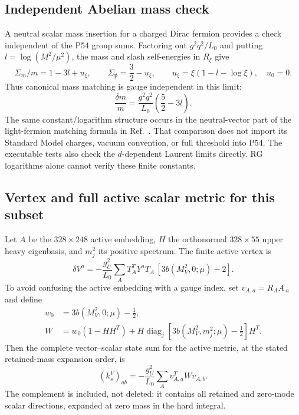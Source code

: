 \documentclass[11pt]{article}
\newcommand{\diag}{\operatorname{diag}}
\begin{document}
\subsection{Independent Abelian mass check}
A neutral scalar mass insertion for a charged Dirac fermion provides a
check independent of the P54 group sums. Factoring out $g^2q^2/L_0$ and
putting $l=\log(M^2/\mu^2)$, the mass and slash self-energies in $R_\xi$
give
\begin{equation}
 \Sigma_m/m=1-3l+u_\xi,\qquad
 \Sigma_{\not p}=\frac32-u_\xi,\qquad
 u_\xi=\xi(1-l-\log\xi),\quad u_0=0.
\end{equation}
Thus canonical mass matching is gauge independent in this limit:
\begin{equation}
 \frac{\delta m}{m}=\frac{g^2q^2}{L_0}\left(\frac52-3l\right).
\end{equation}
The same constant/logarithm structure occurs in the neutral-vector
part of the light-fermion matching formula in Ref.~\cite{martin}.
That comparison does not import its Standard Model charges, vacuum
convention, or full threshold into P54. The executable tests also check
the $d$-dependent Laurent limits directly. RG logarithms alone cannot
verify these finite constants.

\subsection{Vertex and full active scalar metric for this subset}
Let $A$ be the $328\times248$ active embedding, $H$ the orthonormal
$328\times55$ upper heavy eigenbasis, and $m_j^2$ its positive spectrum.
The finite active vertex is
\begin{equation}\label{eq:vertex}
 \delta V^a=-\frac{g_U^2}{L_0}
 \sum_A T_A^T Y^aT_A\,[3b(M_V^2,0;\mu)-2].
\end{equation}
To avoid confusing the active embedding with a gauge index, set
$v_{A,a}=R_A A_{\cdot a}$ and define
\begin{align}
 w_0&=3b(M_V^2,0;\mu)-\tfrac12,\\
 W&=w_0(1-HH^T)+H\diag_j[3b(M_V^2,m_j^2;\mu)-\tfrac12]H^T.
\end{align}
Then the complete vector--scalar state sum for the active metric, at the
stated retained-mass expansion order, is
\begin{equation}\label{eq:ks}
 (k_s^V)_{ab}=-\frac{g_U^2}{L_0}\sum_A v_{A,a}^TWv_{A,b}.
\end{equation}
The complement is included, not deleted: it contains all retained and
zero-mode scalar directions, expanded at zero mass in the hard integral.
\end{document}
